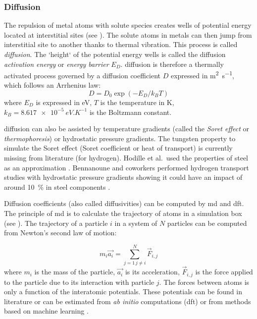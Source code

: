 \subsubsection{Diffusion}
The repulsion of metal atoms with solute species creates wells of potential energy located at interstitial sites (see ).
The solute atoms in metals can then jump from interstitial site to another thanks to thermal vibration.
This process is called \emph{\gls{diffusion}}.
The `height` of the potential energy wells is called the \gls{diffusion} \textit{activation energy} or \textit{energy barrier} $E_D$.
\Gls{diffusion} is therefore a thermally activated process governed by a diffusion coefficient $D$ expressed in \si{m^2.s^{-1}}, which follows an Arrhenius law:
\begin{equation}
    D = D_0 \exp{(-E_D/k_B T)}
\end{equation}
where $E_D$ is expressed in \si{eV}, $T$ is the temperature in \si{K}, $k_B = \SI{8.617e-5}{eV.K^{-1}}$ is the Boltzmann constant.

\Gls{diffusion} can also be assisted by temperature gradients (called the \emph{\gls{Soret effect}} or \emph{\gls{thermophoresis}})  or hydrostatic pressure gradients.
The tungsten property to simulate the \gls{Soret effect} (Soret coefficient or heat of transport) is currently missing from literature (for hydrogen).
Hodille et al.\ used the properties of steel as an approximation \cite{hodille_estimation_2017}.
Bennanoune and coworkers performed hydrogen transport studies with hydrostatic pressure gradients showing it could have an impact of around \SI{10}{\%} in steel components .

Diffusion coefficients (also called diffusivities) can be computed by \gls{md} and \gls{dft}.
The principle of \gls{md} is to calculate the trajectory of atoms in a simulation box (see ).
The trajectory of a particle $i$ in a system of $N$ particles can be computed from Newton's second law of motion:

\begin{equation}
    m_i \vec{a_i} = \sum_{j=1 \, j \neq i}^N \vec{F}_{i,j}
\end{equation}
where $m_i$ is the mass of the particle, $\vec{a_i}$ is its acceleration, $\vec{F}_{i,j}$ is the force applied to the particle due to its interaction with particle $j$.
The forces between atoms is only a function of the interatomic potentials.
These potentials can be found in literature or can be estimated from \textit{ab initio} computations (\gls{dft})  or from methods based on machine learning .

